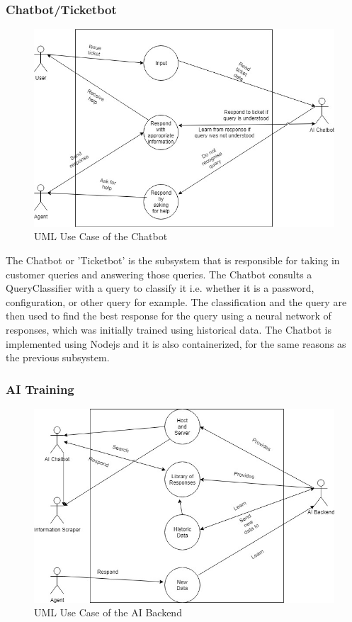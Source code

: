 \documentclass[11pt]{article}
\begin{document}
\subsubsection{Chatbot/Ticketbot}

\begin{figure}[H]
	\centering
	\includegraphics[width=1.0\textwidth]{../../images/AI_Chatbot_UCD.jpg}
	\caption{UML Use Case of the Chatbot}
\end{figure}

The Chatbot or 'Ticketbot' is the subsystem that is responsible for taking in customer queries and answering those queries. The Chatbot consults a QueryClassifier with a query to classify it i.e. whether it is a password, configuration, or other query for example. The classification and the query are then used to find the best response for the query using a neural network of responses, which was initially trained using historical data. The Chatbot is implemented using Nodejs and it is also containerized, for the same reasons as the previous subsystem.

\subsubsection{AI Training}

\begin{figure}[H]
	\centering
	\includegraphics[width=1.0\textwidth]{../../images/AI_Backend_UCD.jpg}
	\caption{UML Use Case of the AI Backend}
\end{figure}
\end{document}
